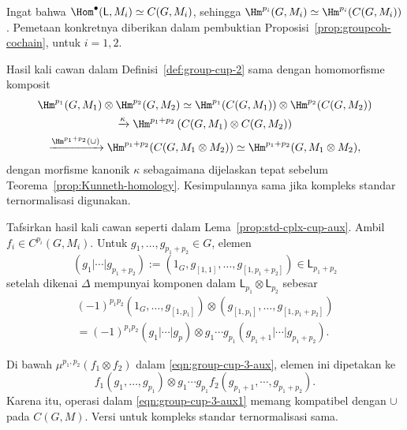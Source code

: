 Ingat bahwa $\Hom^\bullet(\mathsf{L},M_i)\simeq C(G,M_i)$, sehingga
$\Hm^{p_i}(G,M_i)\simeq\Hm^{p_i}(C(G,M_i))$. Pemetaan konkretnya diberikan
dalam pembuktian Proposisi~\ref{prop:groupcoh-cochain}, untuk $i=1,2$.

\begin{proposisi}\label{prop:std-cplx-cup}
	Hasil kali cawan dalam Definisi~\ref{def:group-cup-2} sama dengan
	homomorfisme komposit
	\begin{multline*}
		\Hm^{p_1}(G, M_1) \otimes \Hm^{p_2}(G, M_2) \simeq \Hm^{p_1}(C(G, M_1)) \otimes \Hm^{p_2}(C(G, M_2)) \\
		\xrightarrow{\kappa} \Hm^{p_1 + p_2}\left( C(G, M_1) \otimes C(G, M_2) \right) \\
		\xrightarrow{\Hm^{p_1 + p_2}(\cup)} \Hm^{p_1 + p_2}(C(G, M_1 \otimes M_2)) \simeq \Hm^{p_1 + p_2}(G, M_1 \otimes M_2),
	\end{multline*}
	dengan morfisme kanonik $\kappa$ sebagaimana dijelaskan tepat sebelum
	Teorema~\ref{prop:Kunneth-homology}. Kesimpulannya sama jika kompleks standar
	ternormalisasi digunakan.
\end{proposisi}

\begin{bukti}
	Tafsirkan hasil kali cawan seperti dalam
	Lema~\ref{prop:std-cplx-cup-aux}. Ambil $f_i\in C^{p_i}(G,M_i)$. Untuk
	$g_1,\ldots,g_{p_1+p_2}\in G$, elemen
	\[ (g_1 | \cdots | g_{p_1 + p_2}) := \left(1_G, g_{[1, 1]}, \ldots, g_{[1, p_1 + p_2]} \right) \in \mathsf{L}_{p_1 + p_2} \]
	setelah dikenai $\Delta$ mempunyai komponen dalam
	$\mathsf{L}_{p_1}\otimes\mathsf{L}_{p_2}$ sebesar
	\begin{multline*}
		(-1)^{p_1 p_2} \left( 1_G, \ldots, g_{[1, p_1]}\right) \otimes \left(g_{[1, p_1]}, \ldots, g_{[1, p_1 + p_2]} \right) \\
		= (-1)^{p_1 p_2} (g_1 | \cdots | g_p) \otimes g_1 \cdots g_{p_1} \left( g_{p_1 + 1} |\cdots| g_{p_1 + p_2} \right).
	\end{multline*}

	Di bawah $\mu^{p_1,p_2}(f_1\otimes f_2)$ dalam
	\eqref{eqn:group-cup-3-aux}, elemen ini dipetakan ke
	\[ f_1(g_1, \ldots, g_{p_1}) \otimes g_1 \cdots g_{p_1} f_2(g_{p_1 + 1}, \cdots, g_{p_1 + p_2}). \]
	Karena itu, operasi dalam \eqref{eqn:group-cup-3-aux1} memang kompatibel
	dengan $\cup$ pada $C(G,M)$. Versi untuk kompleks standar ternormalisasi sama.
\end{bukti}

